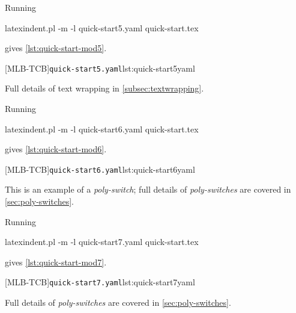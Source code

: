 \documentclass[10pt]{article}
\begin{document}
 \begin{example}
 Running

 \begin{commandshell}
latexindent.pl -m -l quick-start5.yaml quick-start.tex
\end{commandshell}

 gives \cref{lst:quick-start-mod5}.

 \begin{cmhtcbraster}
  [MLB-TCB]{\texttt{quick-start5.yaml}}{lst:quick-start5yaml}
 \end{cmhtcbraster}
 Full details of text wrapping in \cref{subsec:textwrapping}.
 \end{example}

 \begin{example}
 Running

 \begin{commandshell}
latexindent.pl -m -l quick-start6.yaml quick-start.tex
\end{commandshell}

 gives \cref{lst:quick-start-mod6}.

 \begin{cmhtcbraster}
  [MLB-TCB]{\texttt{quick-start6.yaml}}{lst:quick-start6yaml}
 \end{cmhtcbraster}
 This is an example of a \emph{poly-switch}; full details of \emph{poly-switches} are
 covered in \cref{sec:poly-switches}.
 \end{example}

 \begin{example}
 Running

 \begin{commandshell}
latexindent.pl -m -l quick-start7.yaml quick-start.tex
\end{commandshell}

 gives \cref{lst:quick-start-mod7}.

 \begin{cmhtcbraster}
  [MLB-TCB]{\texttt{quick-start7.yaml}}{lst:quick-start7yaml}
 \end{cmhtcbraster}
 Full details of \emph{poly-switches} are covered in \cref{sec:poly-switches}.
 \end{example}
\end{document}
